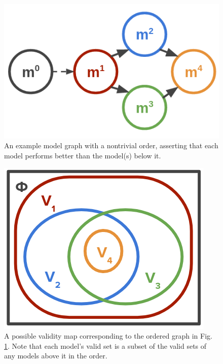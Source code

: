 \documentclass{amsart}
\begin{document}
\begin{figure}[htbp]
    \centerline{\includegraphics[width=0.9\columnwidth]{img/model_tree3.png}}
    \caption{An example model graph with a nontrivial order, asserting that each model performs better than the model(s) below it.}
    \label{fig:modeltree}
\end{figure}

\begin{figure}[htbp]
    \centerline{\includegraphics[width=0.9\columnwidth]{img/v_map.png}}
    \caption{A possible validity map corresponding to the ordered graph in Fig. \ref{fig:modeltree}. Note that each model's valid set is a subset of the valid sets of any models above it in the order.}
    \label{fig:vmap}
\end{figure}
\end{document}
